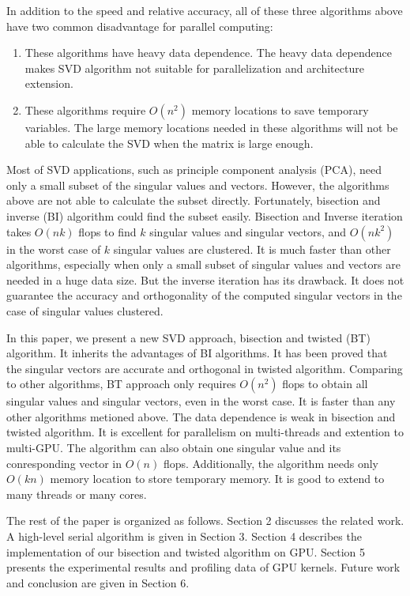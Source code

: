 In addition to the speed and relative accuracy, all of these three algorithms above have two common disadvantage for parallel computing:
\begin{enumerate}
\item These algorithms have heavy data dependence.
The heavy data dependence makes SVD algorithm not suitable for parallelization and architecture extension.
\item  These algorithms require $O(n^2)$ memory locations to save temporary variables.
The large memory locations needed in these algorithms will not be able to calculate the SVD when the matrix is large enough.
\end{enumerate}

Most of SVD applications, such as principle component analysis (PCA), need only a small subset of the singular values and vectors.
However, the algorithms above are not able to calculate the subset directly.
Fortunately, bisection and inverse (BI) algorithm could find the subset easily.
Bisection and Inverse iteration takes $O(nk)$ flops to find $k$ singular values and singular vectors, and $O(nk^2)$ in the worst case of $k$ singular values are clustered.
It is much faster than other algorithms, especially when only a small subset of singular values and vectors are needed in a huge data size.
But the inverse iteration has its drawback.
It does not guarantee the accuracy and orthogonality of the computed singular vectors in the case of singular values clustered.

In this paper, we present a new SVD approach, bisection and twisted (BT) algorithm.
It inherits the advantages of BI algorithms.
It has been proved that the singular vectors are accurate and orthogonal in twisted algorithm\cite{09NLAAtwisted}.
Comparing to other algorithms, BT approach only requires $O(n^2)$ flops to obtain all singular values and singular vectors\cite{09NLAAtwisted,05UCB}, even in the worst case.
It is faster than any other algorithms metioned above.
The data dependence is weak in bisection and twisted algorithm.
It is excellent for parallelism on multi-threads and extention to multi-GPU.
The algorithm can also obtain one singular value and its conresponding vector in $O(n)$ flops.
Additionally, the algorithm needs only $O(kn)$ memory location to store temporary memory.
It is good to extend to many threads or many cores.

The rest of the paper is organized as follows.
Section 2 discusses the related work.
A high-level serial algorithm is given in Section 3.
Section 4 describes the implementation of our bisection and twisted algorithm on GPU.
Section 5 presents the experimental results and profiling data of GPU kernels.
Future work and conclusion are given in Section 6.

